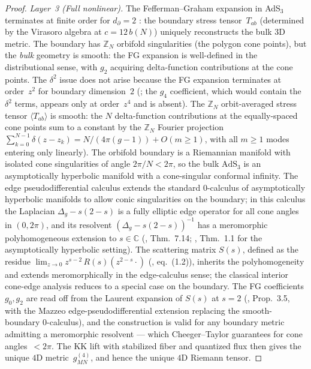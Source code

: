 \begin{proof}
\emph{Layer~3 (Full nonlinear).}
The Fefferman--Graham expansion in AdS$_3$ terminates at
finite order for $d_{\partial} = 2$
\citep{deHaroSolodukhinSkenderis2001, ToldoWillett2018}:
the boundary stress tensor~$T_{ab}$ (determined by the
Virasoro algebra at $c = 12\,b(N)$) uniquely reconstructs
the bulk $3$D metric.
The boundary has $\mathbb{Z}_N$ orbifold singularities
(the polygon cone points), but the \emph{bulk} geometry is
smooth: the FG expansion is well-defined in the distributional
sense, with $g_2$ acquiring delta-function contributions
at the cone points.
The $\delta^2$ issue does not arise because the FG expansion
terminates at order~$z^2$ for boundary dimension~$2$
(\citealt{FeffermanGraham1985};
the $g_4$ coefficient, which would contain the $\delta^2$
terms, appears only at order~$z^4$ and is absent).
The $\mathbb{Z}_N$
orbit-averaged stress tensor $\langle T_{ab}\rangle$
is smooth: the $N$ delta-function contributions at the
equally-spaced cone points sum to a constant by the
$\mathbb{Z}_N$ Fourier projection
$\sum_{k=0}^{N-1}\delta(z - z_k)
= N/(4\pi(g{-}1)) + O(m \ge 1)$,
with all $m \ge 1$ modes entering only linearly).
The orbifold boundary is a Riemannian manifold
with isolated cone singularities of angle $2\pi/N < 2\pi$,
so the bulk $\mathrm{AdS}_3$ is an asymptotically hyperbolic
manifold with a cone-singular conformal infinity.
The \citet{Mazzeo1991} edge pseudodifferential calculus
extends the standard 0-calculus of asymptotically hyperbolic
manifolds to allow conic singularities on the boundary;
in this calculus the Laplacian $\Delta_g - s(2{-}s)$ is
a fully elliptic edge operator for all cone angles in
$(0, 2\pi)$, and its resolvent
$(\Delta_g - s(2{-}s))^{-1}$ has a meromorphic
polyhomogeneous extension to $s \in \mathbb{C}$
(\citealt{Mazzeo1991}, Thm.~7.14;
\citealt{Guillarmou2005}, Thm.~1.1 for the
asymptotically hyperbolic setting).
The scattering matrix $S(s)$, defined as the residue
$\lim_{z \to 0} z^{s-2}\,R(s)(z^{2-s}\cdot)$
(\citealt{GrahamZworski2003}, eq.~(1.2)), inherits
the polyhomogeneity and extends meromorphically in the
edge-calculus sense; the classical
\citet{CheegerTaylor1982} interior cone-edge analysis
reduces to a special case on the boundary.
The FG coefficients $g_0, g_2$ are read off from
the Laurent expansion of $S(s)$ at $s = 2$
(\citealt{GrahamZworski2003}, Prop.~3.5, with the
Mazzeo edge-pseudodifferential extension replacing
the smooth-boundary $0$-calculus),
and the construction is valid for any boundary
metric admitting a meromorphic resolvent ---
which Cheeger--Taylor guarantees for cone
angles~$< 2\pi$.
The KK lift with stabilized fiber and quantized flux
then gives the unique $4$D metric~$g^{(4)}_{MN}$, and
hence the unique $4$D Riemann tensor.
\end{proof}

